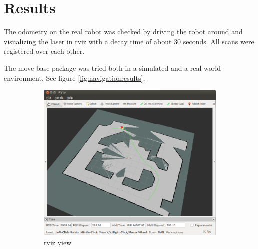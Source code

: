 \documentclass[a4paper]{article}
\begin{document}
\section{Results}

The odometry on the real robot was checked by driving the robot around and visualizing the
laser in rviz with a decay time of about 30 seconds. All scans were registered over
each other.

The move-base package was tried both in a simulated and a real world environment.
See figure \ref{fig:navigationresults}.

\begin{figure}[h!]
  \centering
  \begin{subfigure}[b]{0.8\textwidth}
    \includegraphics[width=\textwidth,height=\textheight,keepaspectratio]{img/navigation_simulation_rviz.png}
    \caption{rviz view}
  \end{subfigure}
  \begin{subfigure}[b]{0.8\textwidth}

\end{subfigure}
\end{figure}
\end{document}
